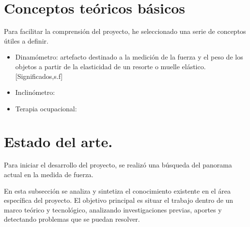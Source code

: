 \section{Conceptos teóricos básicos}
Para facilitar la comprensión del proyecto, he seleccionado una serie de conceptos útiles a definir. 
\begin{itemize}
    \item Dinamómetro: artefacto destinado a la medición de la fuerza y el peso de los objetos a partir de la elasticidad de un resorte o muelle elástico.[Significados,s.f]
    \item Inclinómetro:
    \item Terapia ocupacional: 

\end{itemize}

\section{Estado del arte.}

Para iniciar el desarrollo del proyecto, se realizó una búsqueda del panorama actual en la medida de fuerza. 

En esta subsección se analiza y sintetiza el conocimiento existente en el área específica del proyecto. El objetivo principal es situar el trabajo dentro de un marco teórico y tecnológico, analizando investigaciones previas, aportes y detectando problemas que se puedan resolver.
